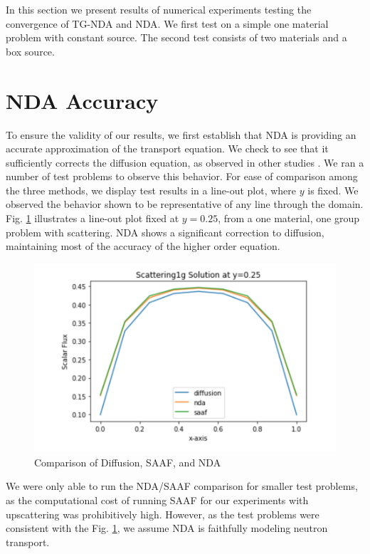 In this section we present results of numerical experiments testing the convergence of TG-NDA and NDA. We first test on a simple one material problem with constant source. The second test consists of two materials and a box source. 

\section{NDA Accuracy}

To ensure the validity of our results, we first establish that NDA is providing an accurate approximation of the transport equation. We check to see that it sufficiently corrects the diffusion equation, as observed in other studies \cite{morel-holo, Wang2013}. We ran a number of test problems to observe this behavior. For ease of comparison among the three methods, we display test results in a line-out plot, where $y$ is fixed. We observed the behavior shown to be representative of any line through the domain. Fig. \ref{fig:comparison} illustrates a line-out plot fixed at $y=0.25$, from a one material, one group problem with scattering. NDA shows a significant correction to diffusion, maintaining most of the accuracy of the higher order equation. 
\begin{figure}[H]
    \centering
    \includegraphics[width=.75\textwidth]{fig/LineOut25.png}
    \caption{Comparison of Diffusion, SAAF, and NDA}
    \label{fig:comparison}
\end{figure}

We were only able to run the NDA/SAAF comparison for smaller test problems, as the computational cost of running SAAF for our experiments with upscattering was prohibitively high.  However, as the test problems were consistent with the Fig. \ref{fig:comparison}, we assume NDA is faithfully modeling neutron transport. 

